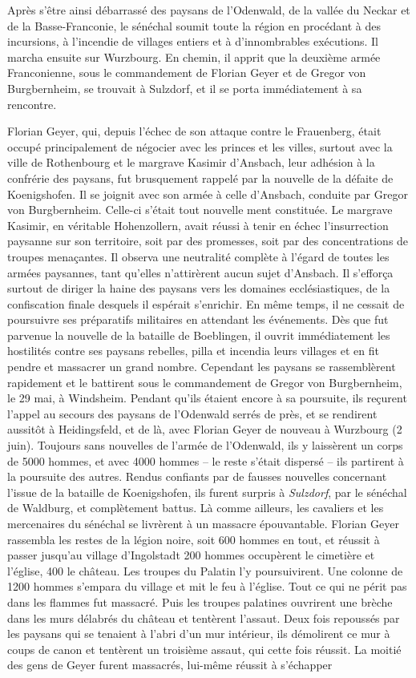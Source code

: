 \documentclass[french,twoside]{book} %
\begin{document}
Après s’être ainsi débarrassé des paysans de l’Odenwald, de la vallée du Neckar et de la Basse-Franconie, le sénéchal soumit toute la région en procédant à des incursions, à l’incendie de villages entiers et à d’innombrables exécutions. Il marcha ensuite sur Wurzbourg. En chemin, il apprit que la deuxième armée Franconienne, sous le commandement de Florian Geyer et de Gregor von Burgbernheim, se trouvait à Sulzdorf, et il se porta immédiatement à sa rencontre.\par
Florian Geyer, qui, depuis l’échec de son attaque contre le Frauenberg, était occupé principalement de négocier avec les princes et les villes, surtout avec la ville de Rothenbourg et le margrave Kasimir d’Ansbach, leur adhésion à la confrérie des paysans, fut brusquement rappelé par la nouvelle de la défaite de Koenigshofen. Il se joignit avec son armée à celle d’Ansbach, conduite par Gregor von Burgbernheim. Celle-ci s’était tout nouvelle ment constituée. Le margrave Kasimir, en véritable Hohenzollern, avait réussi à tenir en échec l’insurrection paysanne sur son territoire, soit par des promesses, soit par des concentrations de troupes menaçantes. Il observa une neutralité complète à l’égard de toutes les armées paysannes, tant qu’elles n’attirèrent aucun sujet d’Ansbach. Il s’efforça surtout de diriger la haine des paysans vers les domaines ecclésiastiques, de la confiscation finale desquels il espérait s’enrichir. En même temps, il ne cessait de poursuivre ses préparatifs militaires en attendant les événements. Dès que fut parvenue la nouvelle de la bataille de Boeblingen, il ouvrit immédiatement les hostilités contre ses paysans rebelles, pilla et incendia leurs villages et en fit pendre et massacrer un grand nombre. Cependant les paysans se rassemblèrent rapidement et le battirent sous le commandement de Gregor von Burgbernheim, le 29 mai, à Windsheim. Pendant qu’ils étaient encore à sa poursuite, ils reçurent l’appel au secours des paysans de l’Odenwald serrés de près, et se rendirent aussitôt à Heidingsfeld, et de là, avec Florian Geyer de nouveau à Wurzbourg (2 juin). Toujours sans nouvelles de l’armée de l’Odenwald, ils y laissèrent un corps de 5000 hommes, et avec 4000 hommes – le reste s’était dispersé – ils partirent à la poursuite des autres. Rendus confiants par de fausses nouvelles concernant l’issue de la bataille de Koenigshofen, ils furent surpris à \emph{Sulzdorf}, par le sénéchal de Waldburg, et complètement battus. Là comme ailleurs, les cavaliers et les mercenaires du sénéchal se livrèrent à un massacre épouvantable. Florian Geyer rassembla les restes de la légion noire, soit 600 hommes en tout, et réussit à passer jusqu’au village d’Ingolstadt 200 hommes occupèrent le cimetière et l’église, 400 le château. Les troupes du Palatin l’y poursuivirent. Une colonne de 1200 hommes s’empara du village et mit le feu à l’église. Tout ce qui ne périt pas dans les flammes fut massacré. Puis les troupes palatines ouvrirent une brèche dans les murs délabrés du château et tentèrent l’assaut. Deux fois repoussés par les paysans qui se tenaient à l’abri d’un mur intérieur, ils démolirent ce mur à coups de canon et tentèrent un troisième assaut, qui cette fois réussit. La moitié des gens de Geyer furent massacrés, lui-même réussit à s’échapper 
\end{document}
